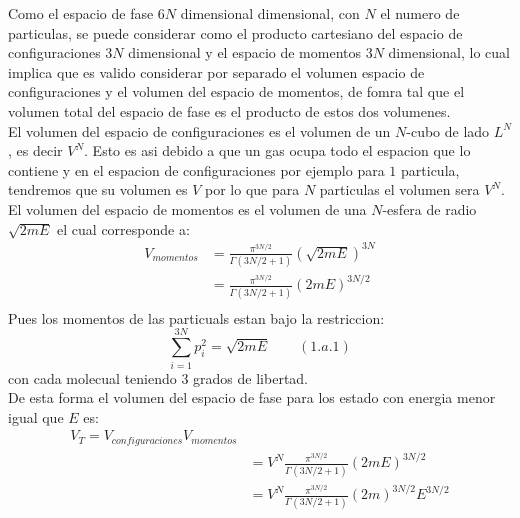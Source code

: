 \begin{answer}[literal a]
    Como el espacio de fase $6N$ dimensional dimensional, con $N$ el numero de particulas, se puede considerar como el producto cartesiano del espacio de configuraciones $3N$ dimensional
    y el espacio de momentos $3N$ dimensional, lo cual implica que es valido considerar por separado el volumen espacio de configuraciones y el volumen del espacio de momentos, de fomra 
    tal que el volumen total del espacio de fase es el producto de estos dos volumenes.\\
    El volumen del espacio de configuraciones es el volumen de un $N$-cubo de lado $L^N$, es decir $V^N$. Esto es asi debido a que un gas ocupa todo el espacion que lo contiene y en el espacion 
    de configuraciones por ejemplo para $1$ particula, tendremos que su volumen es $V$ por lo que para $N$ particulas el volumen sera $V^N$.\\
    El volumen del espacio de momentos es el volumen de una $N$-esfera de radio $\sqrt{2mE}$ el cual corresponde a:
    \begin{align*}
        V_{momentos} &= \frac{\pi^{3N/2}}{\Gamma(3N/2 + 1)} (\sqrt{2mE})^{3N} \\
        &= \frac{\pi^{3N/2}}{\Gamma(3N/2 + 1)} (2mE)^{3N/2} \\
    \end{align*}
    Pues los momentos de las particuals estan bajo la restriccion:
    $$\sum_{i=1}^{3N} p_i^2 = \sqrt{2mE} \qquad (1.a.1)$$
    con cada molecual teniendo $3$ grados de libertad.\\
    De esta forma el volumen del espacio de fase para los estado con energia menor igual que $E$ es:
    \begin{align*}
        V_{T}=V_{configuraciones} V_{momentos} \\
        &= V^N \frac{\pi^{3N/2}}{\Gamma(3N/2 + 1)} (2mE)^{3N/2} \\
        &= V^N \frac{\pi^{3N/2}}{\Gamma(3N/2 + 1)} (2m)^{3N/2} E^{3N/2} \\
    \end{align*}
\end{answer}